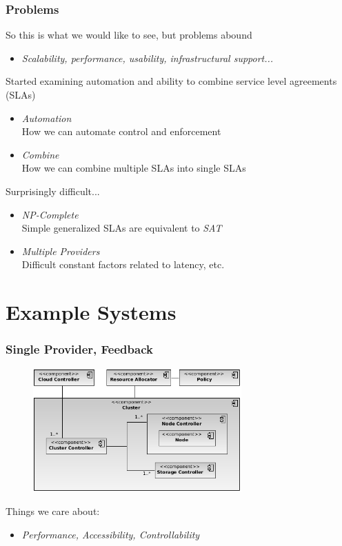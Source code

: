 \documentclass[t, 10pt]{beamer}
\begin{document}
\begin{frame}
\frametitle{Problems}
So this is what we would like to see, but problems abound
\begin{itemize}
\item \textit{Scalability, performance, usability, infrastructural support...}
\end{itemize}
Started examining automation and ability to combine service level agreements (SLAs)
\begin{itemize}
\item \textit{Automation} \\
How we can automate control and enforcement
\item \textit{Combine} \\
How we can combine multiple SLAs into single SLAs
\end{itemize}

Surprisingly difficult...
\begin{itemize}
\item \textit{NP-Complete} \\
Simple generalized SLAs are equivalent to \textit{SAT}
\item \textit{Multiple Providers} \\
Difficult constant factors related to latency, etc.
\end{itemize}
 
\end{frame}

\section{Example Systems}
\begin{frame}
\frametitle{Single Provider, Feedback}

\begin{figure}
\includegraphics[width = 8cm]{Single-QoS}
\end{figure}

Things we care about: \\
\begin{itemize}
\item \textit{Performance, Accessibility, Controllability}
\end{itemize}

\end{frame}
\end{document}
